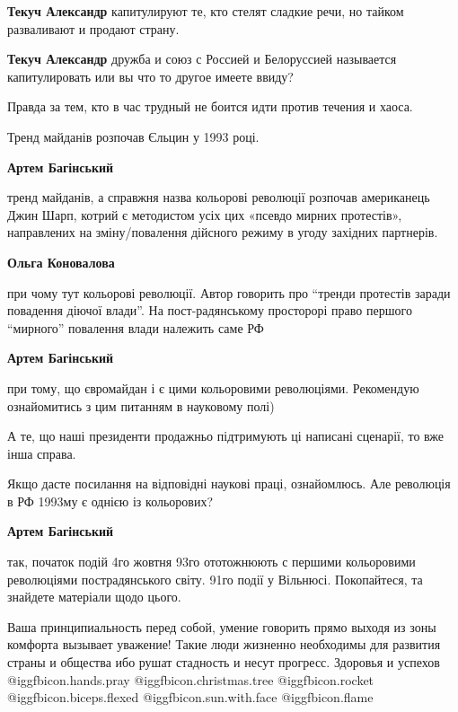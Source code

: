 \begin{itemize}
\begin{itemize}
\textbf{Текуч Александр} капитулируют те, кто стелят сладкие речи, но тайком разваливают и продают страну.

\textbf{Текуч Александр} дружба и союз с Россией и Белоруссией называется капитулировать или вы что то другое имеете ввиду?
\end{itemize} %

Правда за тем, кто в час трудный не боится идти против течения и хаоса.

Тренд майданів розпочав Єльцин у 1993 році.

\begin{itemize} %
\textbf{Артем Багінський} 

тренд майданів, а справжня назва кольорові революції розпочав американець Джин
Шарп, котрий є методистом усіх цих «псевдо мирних протестів», направлених на
зміну/повалення дійсного режиму в угоду західних партнерів.


\textbf{Ольга Коновалова} 

при чому тут кольорові революції. Автор говорить про \enquote{тренди протестів заради
повадення діючої влади}. На пост-радянському просторорі право першого \enquote{мирного}
повалення влади належить саме РФ

\textbf{Артем Багінський} 

при тому, що євромайдан і є цими кольоровими революціями. Рекомендую
ознайомитись з цим питанням в науковому полі)

А те, що наші президенти продажньо підтримують ці написані сценарії, то вже
інша справа.


Якщо дасте посилання на відповідні наукові праці, ознайомлюсь. Але революція в
РФ 1993му є однією із кольорових?

\textbf{Артем Багінський} 

так, початок подій 4го жовтня 93го ототожнюють с першими кольоровими
революціями пострадянського світу. 91го події у Вільнюсі. Покопайтеся, та
знайдете матеріали щодо цього.

\end{itemize} %


Ваша принципиальность перед собой, умение говорить прямо выходя из зоны
комфорта вызывает уважение! Такие люди жизненно необходимы для развития страны
и общества ибо рушат стадность и несут прогресс. Здоровья и успехов
@igg{fbicon.hands.pray}  @igg{fbicon.christmas.tree}  @igg{fbicon.rocket}
@igg{fbicon.biceps.flexed}  @igg{fbicon.sun.with.face}  @igg{fbicon.flame} 


\end{itemize}
